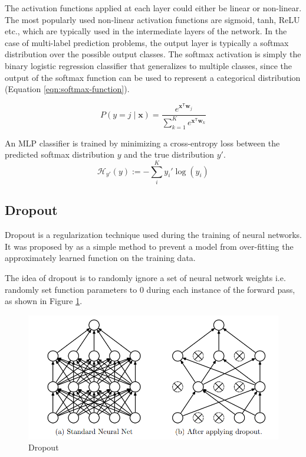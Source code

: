 The activation functions applied at each layer could either be linear or non-linear. The most popularly used non-linear activation functions are sigmoid, tanh, ReLU etc., which are typically used in the intermediate layers of the network. In the case of multi-label prediction problems, the output layer is typically a softmax distribution over the possible output classes. The softmax activation is simply the binary logistic regression classifier that generalizes to multiple classes, since the output of the softmax function can be used to represent a categorical distribution (Equation \ref{eqn:softmax-function}).

\begin{equation} \label{eqn:softmax-function}
	P(y=j \mid \mathbf{x}) = \frac{e^{\mathbf{x}^\mathsf{T}\mathbf{w}_j}}{\sum_{k=1}^K e^{\mathbf{x}^\mathsf{T}\mathbf{w}_k}}
\end{equation}

An MLP classifier is trained by minimizing a cross-entropy loss between the predicted softmax distribution $y$ and the true distribution $y'$.
\begin{equation}
	\mathcal{H}_{y'} (y) := - \sum_{i}^K y_{i}' \log (y_i)
\end{equation}


\subsection{Dropout}

Dropout is a regularization technique used during the training of neural networks. It was proposed by \cite{srivastava2014dropout} as a simple method to prevent a model from over-fitting the approximately learned function on the training data.

The idea of dropout is to randomly ignore a set of neural network weights i.e. randomly set function parameters to 0 during each instance of the forward pass, as shown in Figure \ref{fig:dropout}.

\begin{figure}[ht]
	\centering
	\includegraphics[width=\textwidth]{images/dropout}
	\caption{\label{fig:dropout} Dropout}
\end{figure}

